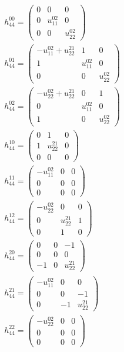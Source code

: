 \documentclass[a4paper, 11pt, twoside, onecolumn]{article}
\begin{document}
\begin{landscape}
\begin{gather*}
	 h_{44}^{00}=\begin{pmatrix}0 & 0 & 0\\0 & u^{02}_{11} & 0\\0 & 0 & u^{02}_{22}\end{pmatrix}\\ 
	 h_{44}^{01}=\begin{pmatrix}- u^{02}_{11} + u^{21}_{22} & 1 & 0\\1 & u^{02}_{11} & 0\\0 & 0 & u^{02}_{22}\end{pmatrix}\\ 
	 h_{44}^{02}=\begin{pmatrix}- u^{02}_{22} + u^{21}_{22} & 0 & 1\\0 & u^{02}_{11} & 0\\1 & 0 & u^{02}_{22}\end{pmatrix}\\ 
	 h_{44}^{10}=\begin{pmatrix}0 & 1 & 0\\1 & u^{21}_{22} & 0\\0 & 0 & 0\end{pmatrix}\\ 
	 h_{44}^{11}=\begin{pmatrix}- u^{02}_{11} & 0 & 0\\0 & 0 & 0\\0 & 0 & 0\end{pmatrix}\\ 
	 h_{44}^{12}=\begin{pmatrix}- u^{02}_{22} & 0 & 0\\0 & u^{21}_{22} & 1\\0 & 1 & 0\end{pmatrix}\\ 
	 h_{44}^{20}=\begin{pmatrix}0 & 0 & -1\\0 & 0 & 0\\-1 & 0 & u^{21}_{22}\end{pmatrix}\\ 
	 h_{44}^{21}=\begin{pmatrix}- u^{02}_{11} & 0 & 0\\0 & 0 & -1\\0 & -1 & u^{21}_{22}\end{pmatrix}\\ 
	 h_{44}^{22}=\begin{pmatrix}- u^{02}_{22} & 0 & 0\\0 & 0 & 0\\0 & 0 & 0\end{pmatrix}\\ 

\end{gather*}
\end{landscape}
\end{document}
